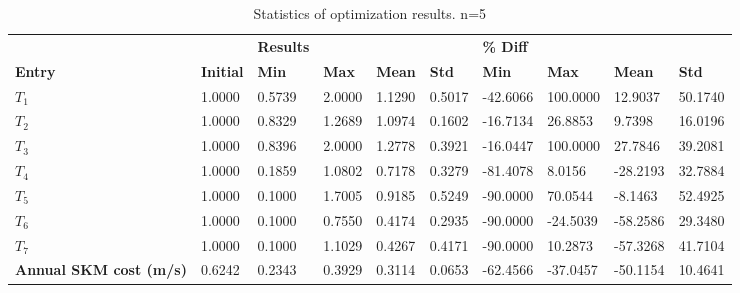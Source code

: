 \begin{table}[H]
\centering
\begin{tabular}{llllllllll}
\textbf{} & \textbf{} & \cellcolor[HTML]{EFEFEF}\textbf{Results} & \cellcolor[HTML]{EFEFEF} & \cellcolor[HTML]{EFEFEF} & \cellcolor[HTML]{EFEFEF} & \cellcolor[HTML]{EFEFEF}\textbf{\% Diff} & \cellcolor[HTML]{EFEFEF} & \cellcolor[HTML]{EFEFEF} & \cellcolor[HTML]{EFEFEF} \\
\rowcolor[HTML]{EFEFEF} 
\textbf{Entry} & \textbf{Initial} & \textbf{Min} & \textbf{Max} & \textbf{Mean} & \textbf{Std} & \textbf{Min} & \textbf{Max} & \textbf{Mean} & \textbf{Std} \\
$T_{1}$ & 1.0000 & 0.5739 & 2.0000 & 1.1290 & 0.5017 & -42.6066 & 100.0000 & 12.9037 & 50.1740 \\ 
$T_{2}$ & 1.0000 & 0.8329 & 1.2689 & 1.0974 & 0.1602 & -16.7134 & 26.8853 & 9.7398 & 16.0196 \\ 
$T_{3}$ & 1.0000 & 0.8396 & 2.0000 & 1.2778 & 0.3921 & -16.0447 & 100.0000 & 27.7846 & 39.2081 \\ 
$T_{4}$ & 1.0000 & 0.1859 & 1.0802 & 0.7178 & 0.3279 & -81.4078 & 8.0156 & -28.2193 & 32.7884 \\ 
$T_{5}$ & 1.0000 & 0.1000 & 1.7005 & 0.9185 & 0.5249 & -90.0000 & 70.0544 & -8.1463 & 52.4925 \\ 
$T_{6}$ & 1.0000 & 0.1000 & 0.7550 & 0.4174 & 0.2935 & -90.0000 & -24.5039 & -58.2586 & 29.3480 \\ 
$T_{7}$ & 1.0000 & 0.1000 & 1.1029 & 0.4267 & 0.4171 & -90.0000 & 10.2873 & -57.3268 & 41.7104 \\ 
\rowcolor[HTML]{EFEFEF} 
\textbf{Annual SKM cost (m/s)} & 0.6242 & 0.2343 & 0.3929 & 0.3114 & 0.0653 & -62.4566 & -37.0457 & -50.1154 & 10.4641 \\ 
\end{tabular}
\caption{Statistics of optimization results. n=5}
\label{tab:StatisticsOptimizationAnalysis}
\end{table}